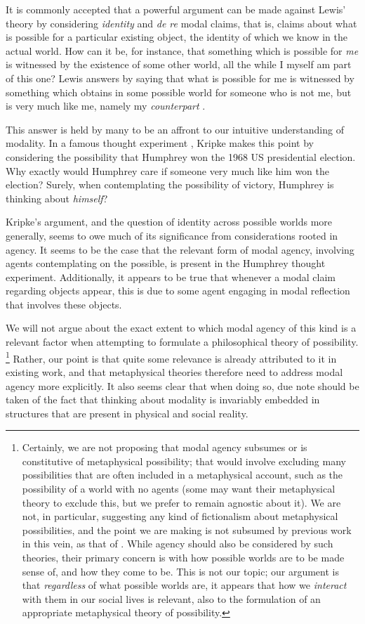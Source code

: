 \documentclass{article}
\begin{document}
It is commonly accepted that a powerful argument can be made against Lewis' theory by considering \emph{identity} and \emph{de re} modal claims, that is, claims about what is possible for a particular existing object, the identity of which we know in the actual world. How can it be, for instance, that something which is possible for \emph{me} is witnessed by the existence of some other world, all the while I myself am part of this one? Lewis answers by saying that what is possible for me is witnessed by something which obtains in some possible world for someone who is not me, but is very much like me, namely my \emph{counterpart} \cite{LewisCPB}. 

This answer is held by many to be an affront to our intuitive understanding of modality. In a famous thought experiment \cite{KripkeNN}, Kripke makes this point by considering the possibility that Humphrey won the 1968 US presidential election. Why exactly would Humphrey care if someone very much like him won the election? Surely, when contemplating the possibility of victory, Humphrey is thinking about \emph{himself}?

Kripke's argument, and the question of identity across possible worlds more generally, seems to owe much of its significance from considerations rooted in agency. It seems to be the case that the relevant form of modal agency, involving agents contemplating on the possible, is present in the Humphrey thought experiment. Additionally, it appears to be true that whenever a modal claim regarding objects appear, this is due to some agent engaging in modal reflection that involves these objects.

We will not argue about the exact extent to which modal agency of this kind is a relevant factor when attempting to formulate a philosophical theory of possibility. \footnote{Certainly, we are not proposing that modal agency subsumes or is constitutive of metaphysical possibility; that would involve excluding many possibilities that are often included in a metaphysical account, such as the possibility of a world with no agents (some may want their metaphysical theory to exclude this, but we prefer to remain agnostic about it). We are not, in particular, suggesting any kind of fictionalism about metaphysical possibilities, and the point we are making is not subsumed by previous work in this vein, as that of \cite{ficr,ficrfix}. While agency should also be considered by such theories, their primary concern is with how possible worlds are to be made sense of, and how they come to be. This is not our topic; our argument is that \emph{regardless} of what possible worlds are, it appears that how we \emph{interact} 
with them in our social lives is relevant, also to the formulation of an appropriate metaphysical theory of possibility.} Rather, our point is that quite some relevance is already attributed to it in existing work, and that metaphysical theories therefore need to address modal agency more explicitly. It also seems clear that when doing so, due note should be taken of the fact that thinking about modality is invariably embedded in structures that are present in physical and social reality.
\end{document}
